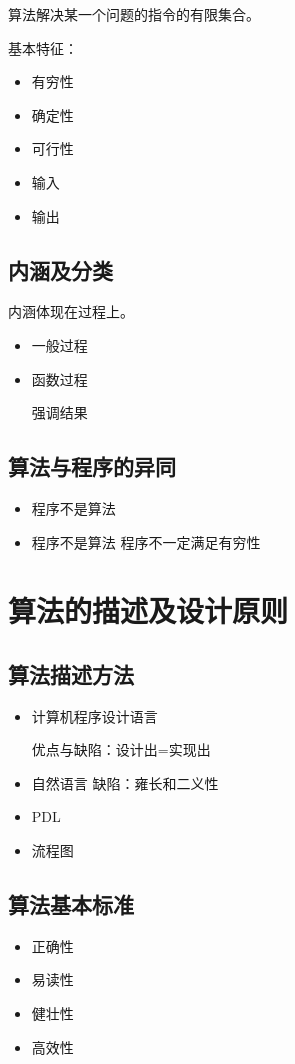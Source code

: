 \documentclass[AutoFakeBold]{LZUThesis2007}
\begin{document}
			算法解决某一个问题的指令的有限集合。

			基本特征：
				\begin{itemize}
					\item 有穷性
					\item 确定性
					\item 可行性
					\item 输入
					\item 输出
				\end{itemize}

		\subsection{内涵及分类}
			内涵体现在过程上。
				\begin{itemize}
					\item 一般过程
					\item 函数过程

						强调结果

				\end{itemize}

		\subsection{算法与程序的异同}
				\begin{itemize}
					\item 程序不是算法
					\item 程序不是算法 程序不一定满足有穷性
				\end{itemize}

	\section{算法的描述及设计原则}
		\subsection{算法描述方法}
			\begin{itemize}
				\item 计算机程序设计语言

					优点与缺陷：设计出=实现出

				\item 自然语言
					缺陷：雍长和二义性
				\item PDL
				\item 流程图
			\end{itemize}

		\subsection{算法基本标准}
			\begin{itemize}
				\item 正确性
				\item 易读性
				\item 健壮性
				\item 高效性
			\end{itemize}
\end{document}

